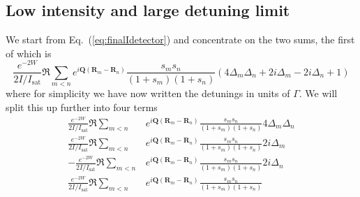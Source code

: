 \documentclass[11pt,letter]{article}
\newcommand{\bv}[1]{\ensuremath{\bm{#1}}}
\begin{document}
\subsection{ Low intensity and large detuning limit}
We start from Eq.~(\ref{eq:finalIdetector}) and concentrate on the two sums, the first of which is 
\begin{equation} 
  \frac{  e^{-2W}}{2I/I_{\mathrm{sat}}} \Re 
  \sum_{m<n} 
               e^{ i \bv{Q}( \bv{R}_{m} - \bv{R}_{n} ) } 
    \frac{ s_{m} s_{n} } {( 1+s_{m} )( 1+s_{n} ) }
    \left(
         4\Delta_{m} \Delta_{n} 
      + 2i \Delta_{m} 
      - 2i \Delta_{n}
      + 1
    \right)  
\end{equation}
where for simplicity we have now written the detunings in units of $\Gamma$.  We will split this up further into four terms 
\begin{align} 
  \frac{  e^{-2W}}{2I/I_{\mathrm{sat}}} \Re \sum_{m<n} & 
      e^{ i \bv{Q}( \bv{R}_{m} - \bv{R}_{n} ) } 
      \frac{ s_{m} s_{n} } {( 1+s_{m} )( 1+s_{n} ) } 4 \Delta_{m} \Delta_{n} \\
  \frac{  e^{-2W}}{2I/I_{\mathrm{sat}}} \Re \sum_{m<n} & 
      e^{ i \bv{Q}( \bv{R}_{m} - \bv{R}_{n} ) } 
      \frac{ s_{m} s_{n} } {( 1+s_{m} )( 1+s_{n} ) } 2 i \Delta_{m}  \\
  -\frac{  e^{-2W}}{2I/I_{\mathrm{sat}}} \Re \sum_{m<n} & 
      e^{ i \bv{Q}( \bv{R}_{m} - \bv{R}_{n} ) } 
      \frac{ s_{m} s_{n} } {( 1+s_{m} )( 1+s_{n} ) } 2 i \Delta_{n}  \\
  \frac{  e^{-2W}}{2I/I_{\mathrm{sat}}} \Re \sum_{m<n} & 
      e^{ i \bv{Q}( \bv{R}_{m} - \bv{R}_{n} ) } 
      \frac{ s_{m} s_{n} } {( 1+s_{m} )( 1+s_{n} ) }   
\end{align}
\end{document}
